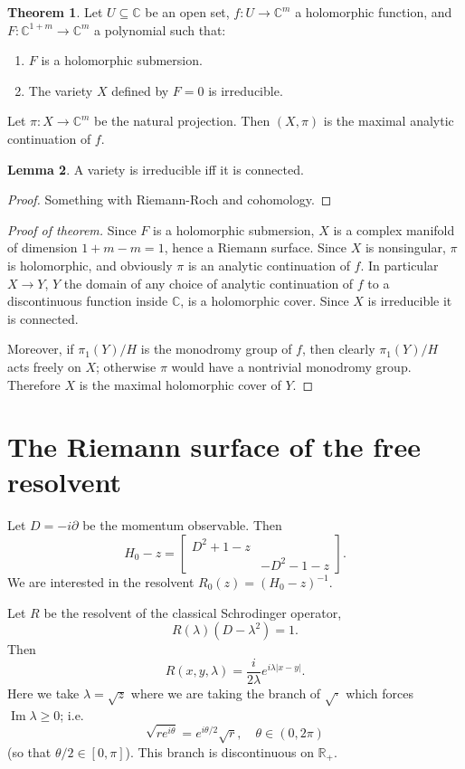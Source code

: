 \documentclass[12pt]{report}
\newcommand{\RR}{\mathbb{R}}
\newcommand{\CC}{\mathbb{C}}
\renewcommand{\Im}{\operatorname{Im}}
\theoremstyle{definition}
\newtheorem{theorem}{Theorem}[chapter]
\newtheorem{lemma}[theorem]{Lemma}
\begin{document}
\begin{theorem}
Let $U \subseteq \CC$ be an open set, $f: U \to \CC^m$ a holomorphic function, and $F: \CC^{1 + m} \to \CC^m$ a polynomial such that:
\begin{enumerate}
\item $F$ is a holomorphic submersion.
\item The variety $X$ defined by $F = 0$ is irreducible.
\end{enumerate}
Let $\pi: X \to \CC^m$ be the natural projection. Then $(X, \pi)$ is the maximal analytic continuation of $f$.
\end{theorem}
\begin{lemma}
A variety is irreducible iff it is connected.
\end{lemma}
\begin{proof}
Something with Riemann-Roch and cohomology.
\end{proof}
\begin{proof}[Proof of theorem]
Since $F$ is a holomorphic submersion, $X$ is a complex manifold of dimension $1+m - m = 1$, hence a Riemann surface.
Since $X$ is nonsingular, $\pi$ is holomorphic, and obviously $\pi$ is an analytic continuation of $f$.
In particular $X \to Y$, $Y$ the domain of any choice of analytic continuation of $f$ to a discontinuous function inside $\CC$, is a holomorphic cover.
Since $X$ is irreducible it is connected.

Moreover, if $\pi_1(Y)/H$ is the monodromy group of $f$, then clearly $\pi_1(Y)/H$ acts freely on $X$; otherwise $\pi$ would have a nontrivial monodromy group. Therefore $X$ is the maximal holomorphic cover of $Y$.
\end{proof}


\section{The Riemann surface of the free resolvent}
Let $D = -i\partial$ be the momentum observable.
Then
$$H_0 - z = \begin{bmatrix}
D^2 + 1 - z\\
&-D^2 - 1 -z
\end{bmatrix}.$$
We are interested in the resolvent $R_0(z) = (H_0 - z)^{-1}$.

Let $R$ be the resolvent of the classical Schrodinger operator,
$$R(\lambda)(D - \lambda^2) = 1.$$
Then
$$R(x, y, \lambda) = \frac{i}{2\lambda} e^{i\lambda|x-y|}.$$
Here we take $\lambda = \sqrt z$ where we are taking the branch of $\sqrt\cdot$ which forces $\Im \lambda \geq 0$; i.e.
$$\sqrt{re^{i\theta}} = e^{i\theta/2}\sqrt r,\quad \theta \in (0, 2\pi)$$
(so that $\theta/2 \in [0, \pi]$). This branch is discontinuous on $\RR_+$.
\end{document}
